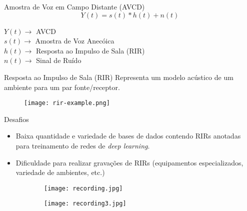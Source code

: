 \begin{frame}{Amostra de Voz em Campo Distante (AVCD)}
    \begin{equation*} \label{eqn:model}
        Y(t) = s(t) \ast h(t) + n(t)
    \end{equation*}
    \vspace{0.5cm}

    $Y(t) \rightarrow$  AVCD \\
    $s(t) \rightarrow$  Amostra de Voz Anecóica \\
    $h(t) \rightarrow$  Resposta ao Impulso de Sala (RIR) \\
    $n(t) \rightarrow$  Sinal de Ruído \\
    
\end{frame}

\begin{frame}{Resposta ao Impulso de Sala (RIR)}
    Representa um modelo acústico de um ambiente para um par fonte/receptor.
    \vspace{0.3cm}

    \begin{figure} 
        \texttt{[image: rir-example.png]}
        \label{fig:rir-example}
    \end{figure}
\end{frame}

\begin{frame}{Desafios}
    \begin{itemize}
        \item Baixa quantidade e variedade de bases de dados contendo RIRs anotadas para treinamento de redes de \textit{deep learning}.
        \item Dificuldade para realizar gravações de RIRs (equipamentos especializados, variedade de ambientes, etc.)
    \end{itemize}
    \vspace{0.5cm}

    \begin{figure}
        \begin{subfigure}{.45\textwidth}
            \centering
            \texttt{[image: recording.jpg]}
        \end{subfigure}
        \begin{subfigure}{.45\textwidth}
            \centering
            \texttt{[image: recording3.jpg]}
        \end{subfigure}
        \label{fig:recording}
    \end{figure}
\end{frame}